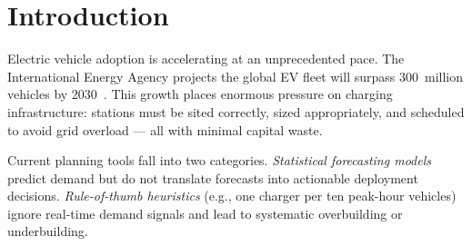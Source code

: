 \documentclass[12pt,a4paper]{article}
\begin{document}
\begin{abstract}
\noindent
The accelerating global adoption of electric vehicles (EVs) creates an urgent need
for intelligent, data-driven charging infrastructure planning tools. This report
presents \textbf{ChargeSense}, a two-phase AI system developed as Project~15 for the
AI/ML course. \textit{Phase~1 (Milestone~1)} builds a classical machine-learning
pipeline using scikit-learn to forecast hourly EV charging demand from historical
station session data, achieving a Mean Absolute Error of \textbf{4.13~kWh} and an
$R^2$ of \textbf{0.69} on a held-out test set. \textit{Phase~2 (Milestone~2)}
extends the system into a stateful \textbf{LangGraph} agentic workflow that detects
demand hotspots, retrieves infrastructure planning guidelines from a \textbf{FAISS}
vector store using Retrieval-Augmented Generation (RAG), and synthesises these with
\textbf{Groq LLaMA-3.1-8B-Instant} LLM reasoning to produce explainable charger
placement, load-balancing, and scheduling recommendations. The full system is deployed
publicly on Streamlit Community Cloud and handles malformed inputs, retrieval failures,
and LLM unavailability through a layered robustness design. This report documents the
complete pipeline, design decisions, evaluation results, and future directions.
\end{abstract}

\tableofcontents
\newpage

\section{Introduction}
\label{sec:intro}

Electric vehicle adoption is accelerating at an unprecedented pace. The International
Energy Agency projects the global EV fleet will surpass 300~million vehicles by
2030~\citep{iea2023}. This growth places enormous pressure on charging infrastructure:
stations must be sited correctly, sized appropriately, and scheduled to avoid grid
overload — all with minimal capital waste.

Current planning tools fall into two categories. \textit{Statistical forecasting
models} predict demand but do not translate forecasts into actionable deployment
decisions. \textit{Rule-of-thumb heuristics} (e.g., one charger per ten peak-hour
vehicles) ignore real-time demand signals and lead to systematic overbuilding or
underbuilding.
\end{document}
